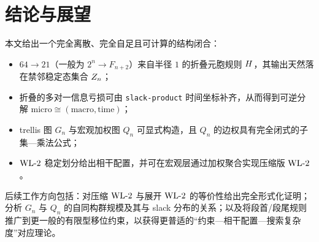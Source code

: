 
\section{结论与展望}

本文给出一个完全离散、完全自足且可计算的结构闭合：
\begin{itemize}
  \item $64\to 21$（一般为 $2^n\to F_{n+2}$）来自半径 $1$ 的折叠元胞规则 $H$，其输出天然落在禁邻稳定态集合 $Z_n$；
  \item 折叠的多对一信息亏损可由 \texttt{slack-product} 时间坐标补齐，从而得到可逆分解 $\text{micro}\cong(\text{macro},\text{time})$；
  \item trellis 图 $G_n$ 与宏观加权图 $Q_n$ 可显式构造，且 $Q_n$ 的边权具有完全闭式的子集—乘法公式；
  \item $\mathrm{WL}\text{-}2$ 稳定划分给出相干配置，并可在宏观层通过加权聚合实现压缩版 $\mathrm{WL}\text{-}2$。
\end{itemize}

后续工作方向包括：对压缩 $\mathrm{WL}\text{-}2$ 与展开 $\mathrm{WL}\text{-}2$ 的等价性给出完全形式化证明；分析 $G_n$ 与 $Q_n$ 的自同构群规模及其与 slack 分布的关系；以及将段首/段尾规则推广到更一般的有限型移位约束，以获得更普适的“约束—相干配置—搜索复杂度”对应理论。

